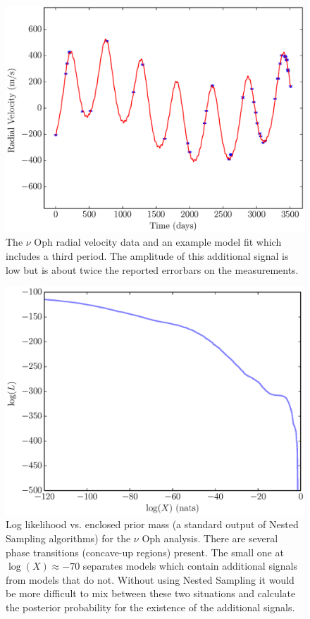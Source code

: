 \documentclass[useAMS,usenatbib]{mn2e}
\begin{document}
\begin{figure}
\includegraphics[scale=0.45]{Figures/nuoph.eps}
\caption{The $\nu$ Oph radial velocity data and an example model fit which
includes a third period. The amplitude of this additional signal is low but
is about twice the reported errorbars on the measurements.\label{fig:nuoph}}
\end{figure}

\begin{figure}
\includegraphics[scale=0.45]{Figures/logl0.eps}
\caption{Log likelihood vs. enclosed prior mass (a standard output of Nested
Sampling algorithms) for the $\nu$ Oph analysis.
There are several phase transitions (concave-up regions) present. The small one at
$\log(X) \approx -70$ separates models which contain additional signals from
models that do not. Without using Nested Sampling it would be more difficult
to mix between these two situations and calculate the posterior probability
for the existence of the additional signals.
\label{fig:logl0}}
\end{figure}
\end{document}
